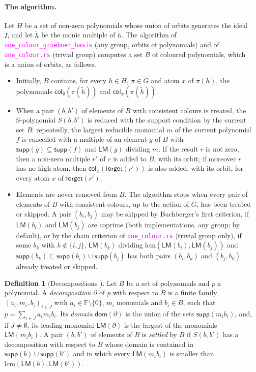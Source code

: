 \documentclass[12pt,a4paper,article]{memoir}
\newcommand{\F}{\mathbb{F}}
\newcommand{\emphdef}[1]{\emph{\textcolor{BrickRed}{#1}}}
\newcommand{\code}[1]{\texttt{\textcolor{magenta}{#1}}}
\newcommand{\supp}{\mathsf{supp}}
\newcommand{\LM}{\mathsf{LM}}
\newcommand{\col}{\mathsf{col}}
\newcommand{\forget}{\mathsf{forget}}
\theoremstyle{definition}
\newtheorem{definition}[theorem]{Definition}
\begin{document}
\paragraph{The algorithm.}
Let $H$ be a set of non-zero polynomials whose union of orbits generates the ideal $I$,
and let $\tilde h$ be the monic multiple of $h$.
The algorithm of \code{one\_colour\_groebner\_basis} (any group, orbits of polynomials)
and of \code{one\_colour.rs} (trivial group) computes a set $B$ of coloured polynomials,
which is a union of orbits, as follows.
\begin{itemize}
\item[(A1)] Initially, $B$ contains, for every $h \in H$, $\pi \in G$ and atom $x$ of $\pi(h)$,
the polynomials $\col_\emptyset(\pi(\tilde h))$ and $\col_x(\pi(\tilde h))$.
\item[(A2)] When a pair $(b, b')$ of elements of $B$ with consistent colours is treated,
the S-polynomial $S(b, b')$ is reduced with the support condition by the current set $B$:
repeatedly, the largest reducible monomial $m$ of the current polynomial $f$ is cancelled
with a multiple of an element $g$ of $B$ with $\supp(g) \subseteq \supp(f)$ and $\LM(g)$ dividing $m$.
If the result $r$ is not zero, then a non-zero multiple $r'$ of $r$ is added to $B$, with its orbit;
if moreover $r$ has no high atom, then $\col_x(\forget(r'))$ is also added, with its orbit,
for every atom $x$ of $\forget(r')$.
\item[(A3)] Elements are never removed from $B$.
The algorithm stops when every pair of elements of $B$ with consistent colours,
up to the action of $G$, has been treated or skipped.
A pair $(b_i, b_j)$ may be skipped by Buchberger's first criterion,
if $\LM(b_i)$ and $\LM(b_j)$ are coprime (both implementations, any group; by default),
or by the chain criterion of \code{one\_colour.rs} (trivial group only),
if some $b_k$ with $k \notin \{i, j\}$, $\LM(b_k)$ dividing $\mathrm{lcm}(\LM(b_i), \LM(b_j))$
and $\supp(b_k) \subseteq \supp(b_i) \cup \supp(b_j)$
has both pairs $(b_i, b_k)$ and $(b_j, b_k)$ already treated or skipped.
\end{itemize}

\begin{definition}[Decompositions {\cite[Definition 17]{GL25}}]
Let $B$ be a set of polynomials and $p$ a polynomial.
A \emphdef{decomposition} $\partial$ of $p$ with respect to $B$
is a finite family $(a_i, m_i, b_i)_{i \in J}$ with $a_i \in \F \setminus \{0\}$, $m_i$ monomials and $b_i \in B$,
such that $p = \sum_{i \in J} a_i m_i b_i$.
Its \emphdef{domain} $\mathsf{dom}(\partial)$ is the union of the sets $\supp(m_i b_i)$,
and, if $J \neq \emptyset$, its leading monomial $\LM(\partial)$ is the largest of the monomials $\LM(m_i b_i)$.
A pair $(b, b')$ of elements of $B$ is \emphdef{settled} by $B$
if $S(b, b')$ has a decomposition with respect to $B$
whose domain is contained in $\supp(b) \cup \supp(b')$
and in which every $\LM(m_i b_i)$ is smaller than $\mathrm{lcm}(\LM(b), \LM(b'))$.
\end{definition}
\end{document}
